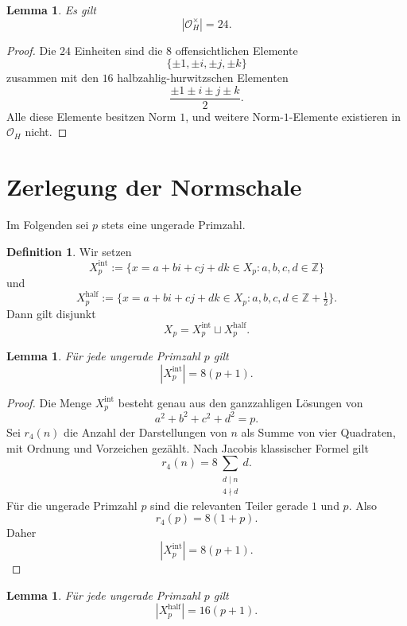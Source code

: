 \documentclass[12pt,a4paper]{article}
\theoremstyle{plain}
\newtheorem{lemma}[satz]{Lemma}
\theoremstyle{definition}
\newtheorem{definition}[satz]{Definition}
\theoremstyle{remark}
\newcommand{\OH}{\mathcal O_H}
\newcommand{\Z}{\mathbb Z}
\begin{document}
	\begin{lemma}
		Es gilt
		\[
		|\OH^\times|=24.
		\]
	\end{lemma}
	
	\begin{proof}
		Die \(24\) Einheiten sind die \(8\) offensichtlichen Elemente
		\[
		\{\pm1,\pm i,\pm j,\pm k\}
		\]
		zusammen mit den \(16\) halbzahlig-hurwitzschen Elementen
		\[
		\frac{\pm1\pm i\pm j\pm k}{2}.
		\]
		Alle diese Elemente besitzen Norm \(1\), und weitere Norm-\(1\)-Elemente existieren in \(\OH\) nicht.
	\end{proof}
	
	\section{Zerlegung der Normschale}
	
	Im Folgenden sei \(p\) stets eine ungerade Primzahl.
	
	\begin{definition}
		Wir setzen
		\[
		X_p^{\mathrm{int}}
		:=
		\{x=a+bi+cj+dk\in X_p : a,b,c,d\in\Z\}
		\]
		und
		\[
		X_p^{\mathrm{half}}
		:=
		\{x=a+bi+cj+dk\in X_p : a,b,c,d\in\Z+\tfrac12\}.
		\]
		Dann gilt disjunkt
		\[
		X_p=X_p^{\mathrm{int}}\sqcup X_p^{\mathrm{half}}.
		\]
	\end{definition}
	
	\begin{lemma}
		Für jede ungerade Primzahl \(p\) gilt
		\[
		|X_p^{\mathrm{int}}|=8(p+1).
		\]
	\end{lemma}
	
	\begin{proof}
		Die Menge \(X_p^{\mathrm{int}}\) besteht genau aus den ganzzahligen Lösungen von
		\[
		a^2+b^2+c^2+d^2=p.
		\]
		Sei \(r_4(n)\) die Anzahl der Darstellungen von \(n\) als Summe von vier Quadraten, mit Ordnung und Vorzeichen gezählt. Nach Jacobis klassischer Formel gilt
		\[
		r_4(n)=8\sum_{\substack{d\mid n\\4\nmid d}} d.
		\]
		Für die ungerade Primzahl \(p\) sind die relevanten Teiler gerade \(1\) und \(p\). Also
		\[
		r_4(p)=8(1+p).
		\]
		Daher
		\[
		|X_p^{\mathrm{int}}|=8(p+1).
		\]
	\end{proof}
	
	\begin{lemma}
		Für jede ungerade Primzahl \(p\) gilt
		\[
		|X_p^{\mathrm{half}}|=16(p+1).
		\]
	\end{lemma}
	
\end{document}
